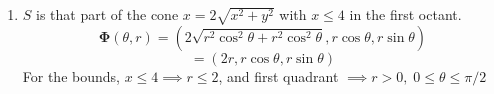 \documentclass{article}
\begin{document}
\begin{enumerate}[label=(\alph*)]
    \item  $S$ is that part of the cone $x = 2 \sqrt{x^2 + y^2}$ with $x \leq 4$ in the first octant.
    \[ \boldsymbol \Phi (\theta, r) = (2\sqrt{r^2\cos^2\theta + r^2\cos^2\theta }, r\cos\theta, r\sin \theta) \]
    \[ = (2r, r\cos\theta, r\sin \theta) \]
    For the bounds, $x \leq 4 \implies r \leq 2$, and first quadrant $\implies r > 0,\; 0 \leq \theta \leq \pi/2$
\end{enumerate}
\end{document}
